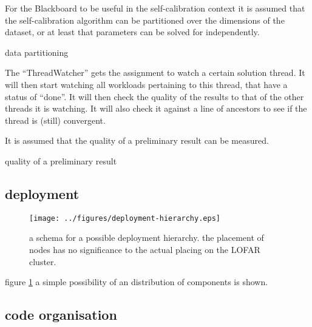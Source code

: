 \documentclass[]{lofar}
\begin{document}
          \begin{assumption}
            For the Blackboard to be useful in the self-calibration
            context it is assumed that the self-calibration algorithm
            can be partitioned over the dimensions of the dataset, or
            at least that parameters can be solved for
            independently.\footnotemark[\value{footnote}]
            \caption{data partitioning\label{ass:partitionable}}
          \end{assumption}


          The ``ThreadWatcher''  gets
          the assignment to watch a certain solution
          thread. It will then start
          watching all workloads pertaining to this thread, that have
          a status of ``done''. It will then check the quality of the
          results to that of the other threads it is watching. It will
          also check it against a line of ancestors to see if the
          thread is (still) convergent.

          \begin{assumption}
            It is assumed that the quality of a preliminary result can be
            measured.\footnotemark[\value{footnote}]
            \caption{ quality of a preliminary result\label{ass:quality}}
          \end{assumption}

    \subsection{deployment}

      \begin{figure}
        \texttt{[image: ../figures/deployment-hierarchy.eps]}
        \hypertarget{fig:deployment-hierarchy}{}
        \caption{a schema for a possible deployment hierarchy. the
        placement of nodes has no significance to the actual placing on
        the LOFAR cluster.\label{fig:deployment-hierarchy}}
      \end{figure}

      figure
      \hyperlink{fig:deployment-hierarchy}{\ref{fig:deployment-hierarchy}}
      a simple possibility of an distribution of components is shown.

    \subsection{code organisation}
\end{document}
